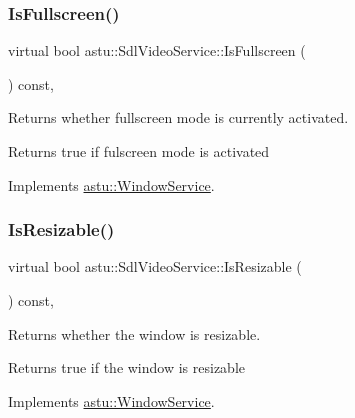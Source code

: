 \subsubsection{\texorpdfstring{Is\+Fullscreen()}{IsFullscreen()}}
{\footnotesize\ttfamily virtual bool astu\+::\+Sdl\+Video\+Service\+::\+Is\+Fullscreen (\begin{DoxyParamCaption}{ }\end{DoxyParamCaption}) const\hspace{0.3cm}{\ttfamily [override]}, {\ttfamily [virtual]}}

Returns whether fullscreen mode is currently activated.

\begin{DoxyReturn}{Returns}
{\ttfamily true} if fulscreen mode is activated 
\end{DoxyReturn}


Implements \hyperlink{classastu_1_1WindowService_aa94ce60d1e8dd7484d364b65c25be1ca}{astu\+::\+Window\+Service}.

\mbox{\label{classastu_1_1SdlVideoService_a335762da99b341205b8bf759a0b57c64}} 
\subsubsection{\texorpdfstring{Is\+Resizable()}{IsResizable()}}
{\footnotesize\ttfamily virtual bool astu\+::\+Sdl\+Video\+Service\+::\+Is\+Resizable (\begin{DoxyParamCaption}{ }\end{DoxyParamCaption}) const\hspace{0.3cm}{\ttfamily [override]}, {\ttfamily [virtual]}}

Returns whether the window is resizable.

\begin{DoxyReturn}{Returns}
{\ttfamily true} if the window is resizable 
\end{DoxyReturn}


Implements \hyperlink{classastu_1_1WindowService_a277954f71dd019b3ffc5d37df3f8b3af}{astu\+::\+Window\+Service}.

\mbox{\label{classastu_1_1SdlVideoService_aa40bb996597ad6c1005ce9dfd632cf28}} 
